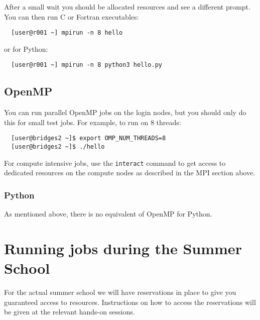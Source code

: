 \documentclass{article}
\begin{document}
After a small wait you should be allocated resources and see a
different prompt. You can then run C or Fortran executables:

\begin{verbatim}
  [user@r001 ~] mpirun -n 8 hello
\end{verbatim}

or for Python:

\begin{verbatim}
  [user@r001 ~] mpirun -n 8 python3 hello.py
\end{verbatim}

\subsection{OpenMP}

You can run parallel OpenMP jobs on the login nodes, but you should
only do this for small test jobs. For example, to run on 8 threads:

\begin{verbatim}
  [user@bridges2 ~]$ export OMP_NUM_THREADS=8
  [user@bridges2 ~]$ ./hello
\end{verbatim}

For compute intensive jobs, use the \verb+interact+ command to get
access to dedicated resources on the compute nodes as described in the
MPI section above.

\subsubsection{Python}

As mentioned above, there is no equivalent of OpenMP for Python.

\section{{\label{sec:running2}}Running jobs during the Summer School}

For the actual summer school we will have reservations in place to
give you guaranteed access to resources. Instructions on how to access
the reservations will be given at the relevant hands-on sessions.
\end{document}
